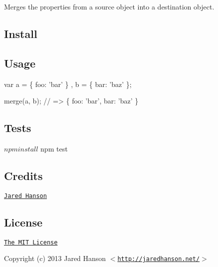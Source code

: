 Merges the properties from a source object into a destination object.

\subsection*{Install}



\subsection*{Usage}


\begin{DoxyCode}
var a = \{ foo: 'bar' \}
  , b = \{ bar: 'baz' \};

merge(a, b);
// => \{ foo: 'bar', bar: 'baz' \}
\end{DoxyCode}


\subsection*{Tests}

\begin{DoxyVerb}$ npm install
$ npm test
\end{DoxyVerb}


\href{http://travis-ci.org/jaredhanson/utils-merge}{\tt }

\subsection*{Credits}


\begin{DoxyItemize}
\item \href{http://github.com/jaredhanson}{\tt Jared Hanson}
\end{DoxyItemize}

\subsection*{License}

\href{http://opensource.org/licenses/MIT}{\tt The M\+IT License}

Copyright (c) 2013 Jared Hanson $<$\href{http://jaredhanson.net/}{\tt http\+://jaredhanson.\+net/}$>$ 